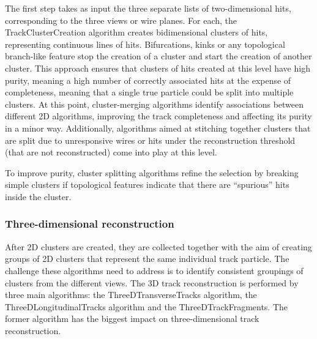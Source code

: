 The first step takes as input the three separate lists of two-dimensional hits, corresponding to the three views or wire planes. For each, the TrackClusterCreation algorithm creates bidimensional clusters of hits, representing continuous lines of hits. Bifurcations, kinks or any topological branch-like feature stop the creation of a cluster and start the creation of another cluster. This approach ensures that clusters of hits created at this level have high purity, meaning a high number of correctly associated hits at the expense of completeness, meaning that a single true particle could be split into multiple clusters. At this point, cluster-merging algorithms identify associations between different 2D algorithms, improving the track completeness and affecting its purity in a minor way. Additionally, algorithms aimed at stitching together clusters that are split due to unresponsive wires or hits under the reconstruction threshold (that are not reconstructed) come into play at this level. 

To improve purity, cluster splitting algorithms refine the selection by breaking simple clusters if topological features indicate that there are ``spurious'' hits inside the cluster. 

\subsubsection{Three-dimensional reconstruction}

After 2D clusters are created, they are collected together with the aim of creating groups of 2D clusters that represent the same individual track particle. The challenge these algorithms need to address is to identify consistent groupings of clusters from the different views. The 3D track reconstruction is performed by three main algorithms: the ThreeDTransverseTracks algorithm, the ThreeDLongitudinalTracks algorithm and the ThreeDTrackFragments. The former algorithm has the biggest impact on three-dimensional track reconstruction.

